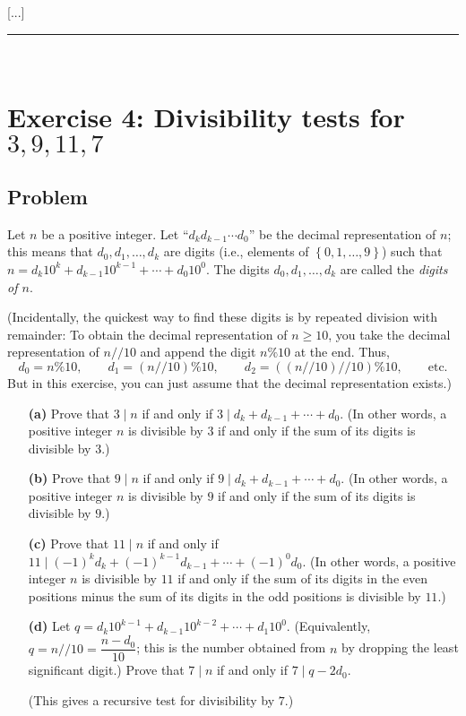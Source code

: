 \documentclass[paper=a4, fontsize=12pt]{scrartcl} %
\newcommand{\set}[1]{\left\{ #1 \right\}}
\newcommand{\tup}[1]{\left( #1 \right)}
\newcommand{\horrule}[1]{\rule{\linewidth}{#1}} %
\theoremstyle{plainsl}
\theoremstyle{definition}
\theoremstyle{remark}
\begin{document}
[...]

\horrule{0.3pt} \\[0.4cm]

\section{Exercise 4: Divisibility tests for $3, 9, 11, 7$}

\subsection{Problem}

Let $n$ be a positive integer.
Let ``$d_k d_{k-1} \cdots d_0$'' be the decimal representation
of $n$;
this means that $d_0, d_1, \ldots, d_k$ are digits
(i.e., elements of $\set{0, 1, \ldots, 9}$) such that
$n = d_k 10^k + d_{k-1} 10^{k-1} + \cdots + d_0 10^0$.
The digits $d_0, d_1, \ldots, d_k$ are called the
\textit{digits of $n$}.

(Incidentally, the quickest way to find these digits
is by repeated division with remainder:
To obtain the decimal representation of $n \geq 10$, you
take the decimal representation of $n // 10$ and append
the digit $n \% 10$ at the end. Thus,
\[
 d_0 = n \% 10, \qquad
 d_1 = \tup{n // 10} \% 10, \qquad
 d_2 = \tup{\tup{n // 10} // 10} \% 10,
 \qquad \text{etc.}
\]
But in this exercise, you can just assume that the decimal
representation exists.)

\begin{enumerate}

\item[\textbf{(a)}]
Prove that $3 \mid n$
if and only if $3 \mid d_k + d_{k-1} + \cdots + d_0$.
(In other words, a positive integer $n$ is divisible
by $3$ if and only if the sum of its digits is
divisible by $3$.)

\item[\textbf{(b)}]
Prove that $9 \mid n$
if and only if $9 \mid d_k + d_{k-1} + \cdots + d_0$.
(In other words, a positive integer $n$ is divisible
by $9$ if and only if the sum of its digits is
divisible by $9$.)

\item[\textbf{(c)}]
Prove that $11 \mid n$
if and only if
$11 \mid \tup{-1}^k d_k + \tup{-1}^{k-1} d_{k-1} + \cdots + \tup{-1}^0 d_0$.
(In other words, a positive integer $n$ is divisible
by $11$ if and only if the sum of its digits in the
even positions minus the sum of its digits in the odd
positions is divisible by $11$.)

\item[\textbf{(d)}]
Let $q = d_k 10^{k-1} + d_{k-1} 10^{k-2} + \cdots + d_1 10^0$.
(Equivalently, $q = n // 10 = \dfrac{n-d_0}{10}$;
this is the number obtained from $n$ by dropping
the least significant digit.)
Prove that $7 \mid n$ if and only if $7 \mid q - 2 d_0$.

(This gives a recursive test for divisibility by $7$.)

\end{enumerate}
\end{document}
